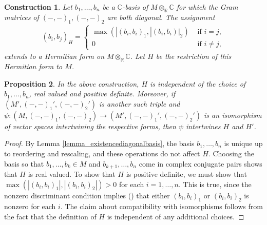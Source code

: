 \documentclass{article} %
\newtheorem{proposition}{Proposition}[section]
\newtheorem{construction}[proposition]{Construction}
\numberwithin{equation}{section}
\newcommand{\R}{\mathbb{R}}
\begin{document}
\begin{construction}\label{con_reduction_covariant}
Let $b_1, \dots, b_n$ be a $\mathbb{C}$-basis of $M \otimes_{\R} \mathbb{C}$ for which the Gram matrices of $(-,-)_1, (-,-)_2$ are both diagonal. 
The assignment
\begin{align*}
    (b_i,b_j)_H = 
    \begin{cases}
        \max(|(b_i,b_i)_1, |(b_i,b_i)|_2) & \text{ if } i=j, \\
        0 & \text{ if } i\neq j,
    \end{cases}
\end{align*}
extends to a Hermitian form on $M \otimes_{\R} \mathbb{C}$.
Let $H$ be the restriction of this Hermitian form to $M$.
\end{construction}

\begin{proposition}\label{prop_basicpropsreductioncovariant}
    In the above construction, $H$ is independent of the choice of $b_1,\dots,b_n$, real valued and positive definite. 
    Moreover, if $(M', (-,-)_1', (-,-)_2')$ is another such triple and $\psi \colon (M,(-,-)_1, (-,-)_2)\rightarrow (M', (-,-)_1', (-,-)_2')$ is an isomorphism of vector spaces intertwining the respective forms, then $\psi$ intertwines $H$ and $H'$.
\end{proposition}
\begin{proof}
    By Lemma \ref{lemma_existencediagonalbasis}, the basis $b_1,\dots,b_n$ is unique up to reordering and rescaling, and these operations do not affect $H$.
    Choosing the basis so that $b_1,\dots,b_k\in M$ and $b_{k+1}, \dots,b_n$ come in complex conjugate pairs shows that $H$ is real valued.
    To show that $H$ is positive definite, we must show that $\max(|(b_i,b_i)_1|, |(b_i,b_i)_2|)>0$ for each $i=1,\dots,n$.
    This is true, since the nonzero discriminant condition implies (\cite[Lemma 6.4(b)]{BSW-squarefreeII}) that either $(b_i,b_i)_1$ or $(b_i,b_i)_2$ is nonzero for each $i$.
    The claim about compatibility with isomorphisms follows from the fact that the definition of $H$ is independent of any additional choices.
\end{proof}
\end{document}
